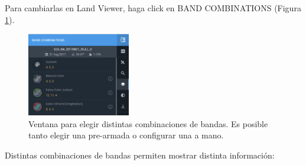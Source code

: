 \documentclass[a4paper,12pt]{book}
\begin{document}
Para cambiarlas en Land Viewer, haga click en BAND COMBINATIONS (Figura \ref{fig:bandas}).

\begin{figure}[h!]
    \centering
    \includegraphics[width=0.4\textwidth]{fig:bandas.png}
    \caption{Ventana para elegir distintas combinaciones de bandas. Es posible tanto elegir una pre-armada o configurar una a mano.}
    \label{fig:bandas}
\end{figure}

Distintas combinaciones de bandas permiten mostrar distinta información:
\end{document}
